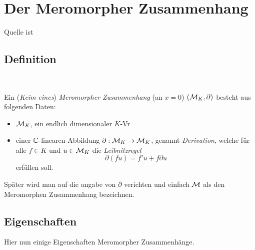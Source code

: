 \chapter{Der Meromorpher Zusammenhang}
Quelle ist \cite{sabbah_cimpa90}
\section{Definition}~

\begin{defn}
  Ein (\emph{Keim eines}) \emph{Meromorpher Zusammenhang} (an $x=0$)
  $(\mathcal{M}_K,\partial)$ besteht aus folgenden Daten:
  \begin{itemize}
    \item $\mathcal{M}_K$, ein endlich dimensionaler $K$-Vr
    \item einer $\mathbb{C}$-linearen Abbildung $\partial:\mathcal{M}_K\rightarrow \mathcal{M}_K$, genannt
      \emph{Derivation}, welche für alle $f\in K$ und $u\in \mathcal{M}_K$ die
      \emph{Leibnitzregel}
      \begin{equation}\label{eq:Leibnitzregel}
        \partial(fu)=f'u+f\partial u
      \end{equation}
      erfüllen soll.
  \end{itemize}
\end{defn}

\begin{bem}
  Später wird man auf die angabe von $\partial$ verichten und einfach $\mathcal{M}$ als
  den Meromorphen Zusammenhang bezeichnen.
\end{bem}

\section{Eigenschaften}
Hier nun einige Eigenschaften Meromorpher Zusammenhänge.

